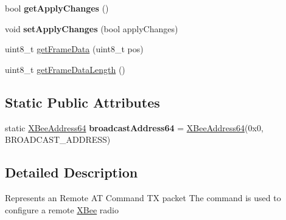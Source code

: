 \begin{DoxyCompactItemize}
\item 
\hypertarget{classRemoteAtCommandRequest_ad9098bc0358fa44f73c0cc51bc244bf3}{bool {\bfseries get\-Apply\-Changes} ()}\label{classRemoteAtCommandRequest_ad9098bc0358fa44f73c0cc51bc244bf3}

\item 
\hypertarget{classRemoteAtCommandRequest_aab7cf2bf1ca644a17bede9abd3929acd}{void {\bfseries set\-Apply\-Changes} (bool apply\-Changes)}\label{classRemoteAtCommandRequest_aab7cf2bf1ca644a17bede9abd3929acd}

\item 
uint8\-\_\-t \hyperlink{classRemoteAtCommandRequest_a0e576cf564ebd5a82cb2ed05239a856a}{get\-Frame\-Data} (uint8\-\_\-t pos)
\item 
uint8\-\_\-t \hyperlink{classRemoteAtCommandRequest_a1d78334a8924b0a0e06de6ef3a09c24f}{get\-Frame\-Data\-Length} ()
\end{DoxyCompactItemize}
\subsection*{\-Static \-Public \-Attributes}
\begin{DoxyCompactItemize}
\item 
\hypertarget{classRemoteAtCommandRequest_a72668f0e22df605d5b32141bd7ca0256}{static \hyperlink{classXBeeAddress64}{\-X\-Bee\-Address64} {\bfseries broadcast\-Address64} = \hyperlink{classXBeeAddress64}{\-X\-Bee\-Address64}(0x0, B\-R\-O\-A\-D\-C\-A\-S\-T\-\_\-\-A\-D\-D\-R\-E\-S\-S)}\label{classRemoteAtCommandRequest_a72668f0e22df605d5b32141bd7ca0256}

\end{DoxyCompactItemize}


\subsection{\-Detailed \-Description}
\-Represents an \-Remote \-A\-T \-Command \-T\-X packet \-The command is used to configure a remote \hyperlink{classXBee}{\-X\-Bee} radio 

